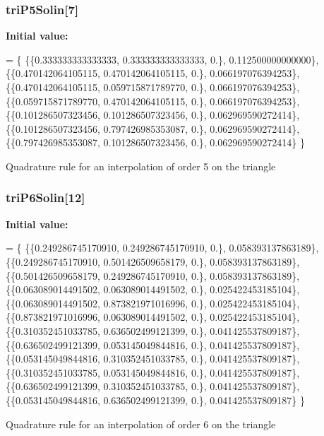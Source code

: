 \subsubsection[{tri\-P5\-Solin}]{ tri\-P5\-Solin[7]}\label{GaussQuadratureTri_8cc_a73e0401d555332f266f292c9873f76f0}
{\bfseries Initial value\-:}
\begin{DoxyCode}
= \{
  \{\{0.333333333333333, 0.333333333333333, 0.\}, 0.112500000000000\},
  \{\{0.470142064105115, 0.470142064105115, 0.\}, 0.066197076394253\},
  \{\{0.470142064105115, 0.059715871789770, 0.\}, 0.066197076394253\},
  \{\{0.059715871789770, 0.470142064105115, 0.\}, 0.066197076394253\},
  \{\{0.101286507323456, 0.101286507323456, 0.\}, 0.062969590272414\},
  \{\{0.101286507323456, 0.797426985353087, 0.\}, 0.062969590272414\},
  \{\{0.797426985353087, 0.101286507323456, 0.\}, 0.062969590272414\}
\}
\end{DoxyCode}
Quadrature rule for an interpolation of order 5 on the triangle 
\subsubsection[{tri\-P6\-Solin}]{ tri\-P6\-Solin[12]}\label{GaussQuadratureTri_8cc_ab5f71a4d305f7a0c99437436c7c2533d}
{\bfseries Initial value\-:}
\begin{DoxyCode}
= \{
  \{\{0.249286745170910, 0.249286745170910, 0.\}, 0.058393137863189\},
  \{\{0.249286745170910, 0.501426509658179, 0.\}, 0.058393137863189\},
  \{\{0.501426509658179, 0.249286745170910, 0.\}, 0.058393137863189\},
  \{\{0.063089014491502, 0.063089014491502, 0.\}, 0.025422453185104\},
  \{\{0.063089014491502, 0.873821971016996, 0.\}, 0.025422453185104\},
  \{\{0.873821971016996, 0.063089014491502, 0.\}, 0.025422453185104\},
  \{\{0.310352451033785, 0.636502499121399, 0.\}, 0.041425537809187\},
  \{\{0.636502499121399, 0.053145049844816, 0.\}, 0.041425537809187\},
  \{\{0.053145049844816, 0.310352451033785, 0.\}, 0.041425537809187\},
  \{\{0.310352451033785, 0.053145049844816, 0.\}, 0.041425537809187\},
  \{\{0.636502499121399, 0.310352451033785, 0.\}, 0.041425537809187\},
  \{\{0.053145049844816, 0.636502499121399, 0.\}, 0.041425537809187\}
\}
\end{DoxyCode}
Quadrature rule for an interpolation of order 6 on the triangle 
